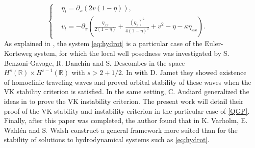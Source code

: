 \documentclass[11pt]{article}
\newcommand{\R}{\mathbb{R}}
\theoremstyle{plain}
\theoremstyle{definition}
\theoremstyle{remark}
\numberwithin{equation}{section}
\begin{document}
{	\begin{equation}\label{eq:hydrot}
		\left\{\begin{aligned}
			&\eta_t=\partial_x(2v(1-\eta)),\\
			&v_t=-\partial_x\left(\frac{\eta_{xx}}{2(1-\eta)}+\frac{(\eta_x)^2}{4(1-\eta)^2}+v^2-\eta-\kappa\eta_{xx}\right).
		\end{aligned}\right.
	\end{equation}
	As explained in \cite{delaire2023exotic}, the system \eqref{eq:hydrot} is a particular case of the Euler-Korteweg system, for which the local well posedness was investigated by S. Benzoni-Gavage, R. Danchin and S. Descombes \cite{benzoniLWP} in the space $ H^{s}(\R)\times H^{{s-1}}(\R)$ with $s>2+1/2$. In \cite{benzoniStab} with D. Jamet they showed existence of homoclinic traveling waves and proved orbital stability of these waves when the VK stability criterion is satisfied. In the same setting, C. Audiard \cite{audiard2017} generalized the ideas in \cite{linbubbles} to prove the VK instability criterion. The present work will detail their proof of the VK stability and instability criterion in the particular case of \eqref{QGP}.
	Finally, after this paper was completed, the author found that in \cite{walshStab} K. Varholm, E. Wahl\'en and S. Walsh construct a general framework more suited than \cite{grillakisshatah} for the stability of solutions to hydrodynamical systems such as \eqref{eq:hydrot}.
	
}
\end{document}
